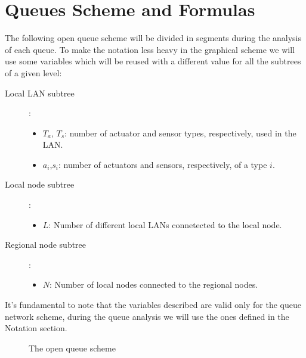 \documentclass[11pt]{article}
\begin{document}
\section{Queues Scheme and Formulas}
The following open queue scheme will be divided in segments during the analysis of each queue.
To make the notation less heavy in the graphical scheme we will use some variables which will be reused with a different value for all the subtrees of a given level:
\begin{description}
	\item[Local LAN subtree]:
	\begin{itemize}
		\item $T_a$, $T_s$: number of actuator and sensor types, respectively, used in the LAN.
		\item $a_i$,$s_i$: number of actuators and sensors, respectively, of a type $i$.
	\end{itemize}
	\item[Local node subtree]:
	\begin{itemize}
		\item $L$: Number of different local LANs connetected to the local node.
	\end{itemize}
	\item[Regional node subtree]:
	\begin{itemize}
	 \item $N$: Number of local nodes connected to the regional nodes.
	\end{itemize}
\end{description}
It's fundamental to note that the variables described are valid only for the queue network scheme, during the queue analysis we will use the ones defined in the Notation section.\\
\begin{figure}[H]
	\vspace*{-0.5cm}
	\hspace*{-3.5cm}
	\centering
	\frame{}
	\caption{The open queue scheme}
\end{figure}
\end{document}
